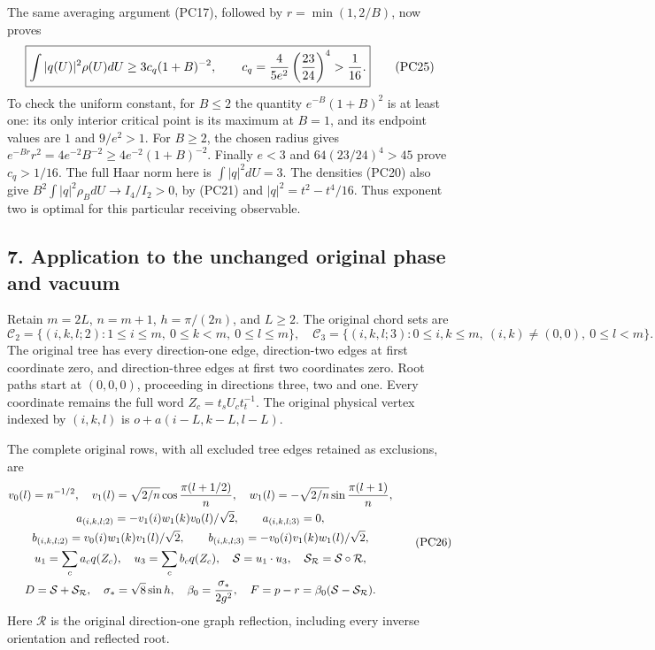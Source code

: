 \documentclass[11pt]{article}
\begin{document}
The same averaging argument (PC17), followed by
\(r=\min(1,2/B)\), now proves
\[
 \boxed{\displaystyle
 \int|q(U)|^2\rho(U)dU
 \ge3c_q(1+B)^{-2},\qquad
 c_q={4\over5e^2}\left({23\over24}\right)^4>{1\over16}.}
 \tag{PC25}
\]
To check the uniform constant, for \(B\le2\) the quantity
\(e^{-B}(1+B)^2\) is at least one: its only interior critical
point is its maximum at \(B=1\), and its endpoint values are
\(1\) and \(9/e^2>1\). For \(B\ge2\), the chosen radius gives
\(e^{-Br}r^2=4e^{-2}B^{-2}\ge4e^{-2}(1+B)^{-2}\).
Finally \(e<3\) and \(64(23/24)^4>45\) prove \(c_q>1/16\).
The full Haar norm here is \(\int|q|^2dU=3\).
The densities (PC20) also give
\(B^2\int|q|^2\rho_BdU\to I_4/I_2>0\), by (PC21) and
\(|q|^2=t^2-t^4/16\). Thus exponent two is optimal for this
particular receiving observable.

\subsection*{7. Application to the unchanged original phase and vacuum}

Retain \(m=2L\), \(n=m+1\), \(h=\pi/(2n)\), and \(L\ge2\).
The original chord sets are
\[
 \mathcal C_2=\{(i,k,l;2):1\le i\le m,\ 0\le k<m,\ 0\le l\le m\},
 \quad
 \mathcal C_3=\{(i,k,l;3):0\le i,k\le m,\ (i,k)\ne(0,0),\
                                      0\le l<m\}.
\]
The original tree has every direction-one edge, direction-two
edges at first coordinate zero, and direction-three edges at first
two coordinates zero. Root paths start at \((0,0,0)\), proceeding
in directions three, two and one. Every coordinate remains the full
word \(Z_c=t_sU_ct_t^{-1}\). The original physical vertex indexed
by \((i,k,l)\) is \(o+a(i-L,k-L,l-L)\).

The complete original rows, with all excluded tree edges retained as
exclusions, are
\[
 \begin{gathered}
 v_0(l)=n^{-1/2},\quad
 v_1(l)=\sqrt{2/n}\cos{\pi(l+1/2)\over n},\quad
 w_1(l)=-\sqrt{2/n}\sin{\pi(l+1)\over n},\\
 a_{(i,k,l;2)}=-v_1(i)w_1(k)v_0(l)/\sqrt2,\qquad
 a_{(i,k,l;3)}=0,\\
 b_{(i,k,l;2)}=v_0(i)w_1(k)v_1(l)/\sqrt2,\qquad
 b_{(i,k,l;3)}=-v_0(i)v_1(k)w_1(l)/\sqrt2,\\
 u_1=\sum_ca_cq(Z_c),\quad u_3=\sum_cb_cq(Z_c),\quad
 \mathcal S=u_1\cdot u_3,\quad
 \mathcal S_{\mathcal R}=\mathcal S\circ\mathcal R,\\
 D=\mathcal S+\mathcal S_{\mathcal R},\quad
 \sigma_*=\sqrt8\sin h,\quad \beta_0={\sigma_*\over2g^2},\quad
 F=p-r=\beta_0(\mathcal S-\mathcal S_{\mathcal R}).
 \end{gathered}\tag{PC26}
\]
Here \(\mathcal R\) is the original direction-one graph reflection,
including every inverse orientation and reflected root.
\end{document}
